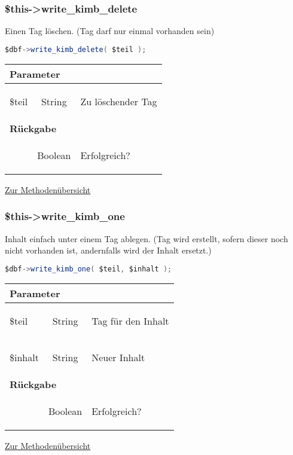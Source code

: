 \documentclass[paper=A4,pagesize=auto,12pt,headinclude=true,footinclude=true,BCOR=0mm,DIV=calc]{scrartcl}
\begin{document}
  \subsubsection{\$this->write\_kimb\_delete}
  \label{sec:mth_del}
	    Einen Tag löschen. (Tag darf nur einmal vorhanden sein)
	    \begin{lstlisting}[gobble=4,language=Java]
	      $dbf->write_kimb_delete( $teil );
	    \end{lstlisting}
	    
	    \begin{tabular}{|lcp{}|}
		    \hline
		      \multicolumn{3}{|l|}{ \textbf{Parameter} } \\
		    \hline
		      \$teil & String & \begin{itshape} Zu löschender Tag \end{itshape} \\
		    \hline
		      \multicolumn{3}{|l|}{ \textbf{Rückgabe} } \\
		    \hline
			     & Boolean & \begin{itshape} Erfolgreich? \end{itshape} \\
		    \hline
	    \end{tabular}
	    \begin{flushright} \small \hyperref[tab:methodenuerbersicht]{Zur Methodenübersicht} \end{flushright}
  
  \subsubsection{\$this->write\_kimb\_one} 
  \label{sec:mth_one_write}
	    Inhalt einfach unter einem Tag ablegen. (Tag wird erstellt, sofern dieser noch nicht vorhanden ist, andernfalls wird der Inhalt ersetzt.)
	    \begin{lstlisting}[gobble=4,language=Java]
	      $dbf->write_kimb_one( $teil, $inhalt );
	    \end{lstlisting}
	    
	    \begin{tabular}{|lcp{}|}
		    \hline
		      \multicolumn{3}{|l|}{ \textbf{Parameter} } \\
		    \hline
		      \$teil & String & \begin{itshape} Tag für den Inhalt \end{itshape} \\
		      \$inhalt & String & \begin{itshape} Neuer Inhalt \end{itshape} \\
		    \hline
		      \multicolumn{3}{|l|}{ \textbf{Rückgabe} } \\
		    \hline
			     & Boolean & \begin{itshape} Erfolgreich? \end{itshape} \\
		    \hline
	    \end{tabular}
	    \begin{flushright} \small \hyperref[tab:methodenuerbersicht]{Zur Methodenübersicht} \end{flushright}
  
\end{document}
